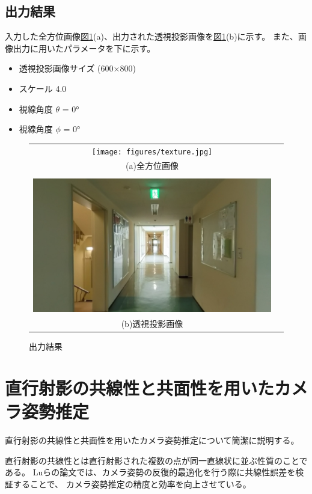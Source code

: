 \documentclass[]{jarticle}          %
\begin{document}
\subsection{出力結果}
入力した全方位画像\hyperref[one]{図\ref{one}}(a)、出力された透視投影画像を\hyperref[one]{図\ref{one}}(b)に示す。
また、画像出力に用いたパラメータを下に示す。
\begin{itemize}
  \item 透視投影画像サイズ (600$\times$800)
  \item スケール 4.0
  \item 視線角度 $\theta$ = 0°
  \item 視線角度 $\phi$ = 0°
\end{itemize}
\begin{figure}[!ht]
  \begin{center}
    \begin{tabular}{cc}
      \texttt{[image: figures/texture.jpg]}\\
      (a)全方位画像\\
      \\
      \includegraphics[keepaspectratio, scale=0.2]{figures/output_image.png}\\
      (b)透視投影画像\\
    \end{tabular}
  \end{center}
  \caption{出力結果}
  \label{one}
\end{figure}
\section{直行射影の共線性と共面性を用いたカメラ姿勢推定}
直行射影の共線性と共面性を用いたカメラ姿勢推定について簡潔に説明する。

直行射影の共線性とは直行射影された複数の点が同一直線状に並ぶ性質のことである。
Luらの論文では、カメラ姿勢の反復的最適化を行う際に共線性誤差を検証することで、
カメラ姿勢推定の精度と効率を向上させている。
\end{document}

